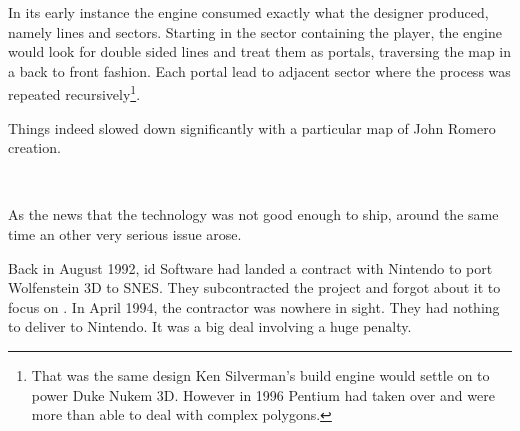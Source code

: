 In its early instance the engine consumed exactly what the designer produced, namely lines and sectors. Starting in the sector containing the player, the engine would look for double sided lines and treat them as portals, traversing the map in a back to front fashion. Each portal lead to adjacent sector where the process was repeated recursively\footnote{That was the same design Ken Silverman's build engine would settle on to power Duke Nukem 3D. However in 1996 Pentium had taken over and were more than able to deal with complex polygons.}.\\
\par
{}
\vspace{1cm}
\par
Things indeed slowed down significantly with a particular map of John Romero creation.\\
\par
{}\\
\par
{}%
\label{HUD_screenshot}
\par
As the news that the technology was not good enough to ship, around the same time an other very serious issue arose.\\
\par
Back in August 1992, id Software had landed a contract with Nintendo to port Wolfenstein 3D to SNES. They subcontracted the project and forgot about it to focus on \doom. In April 1994, the contractor was nowhere in sight. They had nothing to deliver to Nintendo. It was a big deal involving a huge penalty.\\

